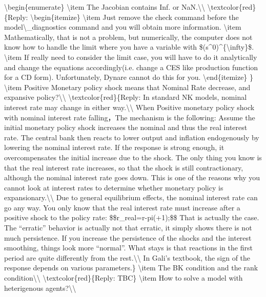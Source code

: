 \documentclass[10pt,math=newtx,citestyle=gb7714-2015,bibstyle=gb7714-2015]{elegantbook}
\begin{document}
	\textbackslash{}begin\{enumerate\}
	\textbackslash{}item The Jacobian contains Inf. or NaN.\textbackslash{}\textbackslash{}
	\textbackslash{}textcolor\{red\}\{Reply:
	\textbackslash{}begin\{itemize\}
	\textbackslash{}item Just remove the check command before the model\textbackslash{}\_diagnostics command and you will obtain more information.
	\textbackslash{}item Mathematically, that is not a problem, but numerically, the computer does not know how to handle the limit where you have a variable with \$(s\^{}0)\^{}\{\textbackslash{}infty\}\$.
	\textbackslash{}item If really need to consider the limit case, you will have to do it analytically and change the equations accordingly(i.e. change a CES like production function for a CD form). Unfortunately, Dynare cannot do this for you.
	\textbackslash{}end\{itemize\}
	\}
	\textbackslash{}item Positive Monetary policy shock means that Nominal Rate decrease, and expansive policy?\textbackslash{}\textbackslash{}
	\textbackslash{}textcolor\{red\}\{Reply: In standard NK models, nominal interest rate may change in either way.\textbackslash{}\textbackslash{}
	When Positive monetary policy shock with nominal interest rate falling，The mechanism is the following: Assume the initial monetary policy shock increases the nominal and thus the real interest rate. The central bank then reacts to lower output and inflation endogenously by lowering the nominal interest rate. If the response is strong enough, it overcompensates the initial increase due to the shock. The only thing you know is that the real interest rate increases, so that the shock is still contractionary, although the nominal interest rate goes down. This is one of the reasons why you cannot look at interest rates to determine whether monetary policy is expansionary.\textbackslash{}\textbackslash{}
	Due to general equilibrium effects, the nominal interest rate can go any way. You only know that the real interest rate must increase after a positive shock to the policy rate:
	\$\$r\_real=r-pi(+1);\$\$
	That is actually the case. The “erratic” behavior is actually not that erratic, it simply shows there is not much persistence. If you increase the persistence of the shocks and the interest smoothing, things look more “normal”. What stays is that reactions in the first period are quite differently from the rest.\textbackslash{}\textbackslash{}
	In Gali’s textbook, the sign of the response depends on various parameters.\}
	\textbackslash{}item The BK condition and the rank condition\textbackslash{}\textbackslash{}
	\textbackslash{}textcolor\{red\}\{Reply: TBC\}
	\textbackslash{}item How to solve a model with heterigenous agents?\textbackslash{}\textbackslash{}
\end{document}
